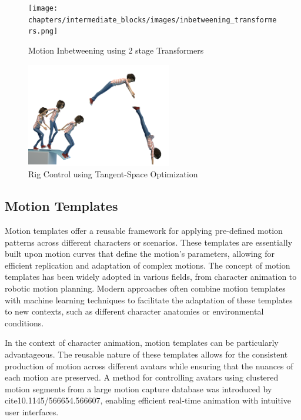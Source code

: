 \documentclass[../../main.tex]{subfiles}
\begin{document}
\begin{figure}
    \centering \texttt{[image: chapters/intermediate\_blocks/images/inbetweening\_transformers.png]}
    \caption{Motion Inbetweening using 2 stage Transformers \cite{10.1145/3306346.3322938}}
    \label{fig:inbetweening_transformers}
\end{figure}

\begin{figure}
    \centering \includegraphics[width = 2.5in]{chapters/intermediate_blocks/images/inbetweening_disney.png}
    \caption{Rig Control using Tangent-Space Optimization}
    \label{fig:inbetweening_disney}
\end{figure}


\subsection{Motion Templates}
\label{ch:intermediate_blocks:related_work:motion_templates}

Motion templates offer a reusable framework for applying pre-defined motion patterns across different characters or scenarios. These templates are essentially built upon motion curves that define the motion's parameters, allowing for efficient replication and adaptation of complex motions. The concept of motion templates has been widely adopted in various fields, from character animation to robotic motion planning. Modern approaches often combine motion templates with machine learning techniques to facilitate the adaptation of these templates to new contexts, such as different character anatomies or environmental conditions.

In the context of character animation, motion templates can be particularly advantageous. The reusable nature of these templates allows for the consistent production of motion across different avatars while ensuring that the nuances of each motion are preserved. A method for controlling avatars using clustered motion segments from a large motion capture database was introduced by cite{10.1145/566654.566607}, enabling efficient real-time animation with intuitive user interfaces.
\end{document}
